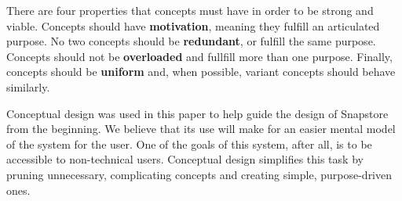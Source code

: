 There are four properties that concepts must have in order to be strong and viable. Concepts should have \textbf{motivation}, meaning they fulfill an articulated purpose. No two concepts should be \textbf{redundant}, or fulfill the same purpose. Concepts should not be \textbf{overloaded} and fullfill more than one purpose. Finally, concepts should be \textbf{uniform} and, when possible, variant concepts should behave similarly.

Conceptual design was used in this paper to help guide the design of Snapstore from the beginning. We believe that its use will make for an easier mental model of the system for the user. One of the goals of this system, after all, is to be accessible to non-technical users. Conceptual design simplifies this task by pruning unnecessary, complicating concepts and creating simple, purpose-driven ones.



